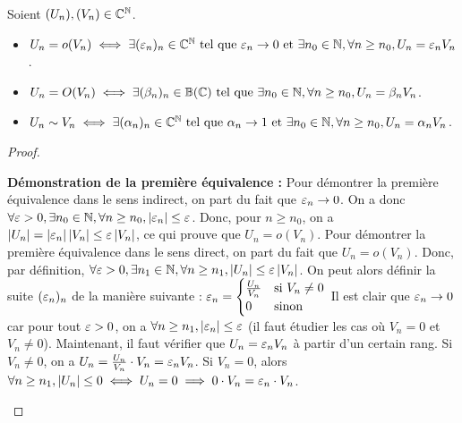 \documentclass[12pt, a4paper]{report}
\begin{document}
\begin{property}
    Soient $(U_n),(V_n)\in\mathbb{C}^{\mathbb{N}}$.
    \begin{itemize}
        \item $U_n = o(V_n) \iff \exists (\varepsilon_n)_n \in \mathbb{C}^{\mathbb{N}} \text{ tel que } \varepsilon_n \to 0 \text{ et } \exists n_0 \in \mathbb{N}, \forall n \ge n_0, U_n = \varepsilon_n V_n$.
        \item $U_n = O(V_n) \iff \exists (\beta_n)_n \in \mathbb{B}(\mathbb{C}) \text{ tel que } \exists n_0 \in \mathbb{N}, \forall n \ge n_0, U_n = \beta_n V_n$.
        \item $U_n \sim V_n \iff \exists (\alpha_n)_n \in \mathbb{C}^{\mathbb{N}} \text{ tel que } \alpha_n \to 1 \text{ et } \exists n_0 \in \mathbb{N}, \forall n \ge n_0, U_n = \alpha_n V_n$.
    \end{itemize}
\end{property}

\begin{proof}
    \begin{outline}
        \1 \textbf{Démonstration de la première équivalence :}
        \2 Pour démontrer la première équivalence dans le sens indirect, on part du fait que $\varepsilon_n \to 0$. On a donc $\forall \varepsilon > 0, \exists n_0 \in \mathbb{N}, \forall n \ge n_0, \left|\varepsilon_n\right| \le \varepsilon$. Donc, pour $n \ge n_0$, on a $\left|U_n\right| = \left|\varepsilon_n\right|\left|V_n\right| \le \varepsilon \left|V_n\right|$, ce qui prouve que $U_n = o(V_n)$.
        \2 Pour démontrer la première équivalence dans le sens direct, on part du fait que $U_n = o(V_n)$. Donc, par définition, $\forall \varepsilon > 0, \exists n_1 \in \mathbb{N}, \forall n \ge n_1, \left|U_n\right| \le \varepsilon \left|V_n\right|$. On peut alors définir la suite $(\varepsilon_n)_n$ de la manière suivante :
        \3 $\varepsilon_n = \begin{cases}
            \frac{U_n}{V_n} & \text{si } V_n \ne 0\\
            0 & \text{sinon}
        \end{cases}$
        \3 Il est clair que $\varepsilon_n \to 0$ car pour tout $\varepsilon > 0$, on a $\forall n \ge n_1, \left|\varepsilon_n\right| \le \varepsilon$ (il faut étudier les cas où $V_n = 0$ et $V_n\ne0$).
        \2 Maintenant, il faut vérifier que $U_n = \varepsilon_n V_n$ à partir d'un certain rang.
        \2 Si $V_n \ne 0$, on a $U_n = \frac{U_n}{V_n} \cdot V_n = \varepsilon_n V_n$.
        \2 Si $V_n = 0$, alors $\forall n \ge n_1, \left|U_n\right| \le 0 \iff U_n= 0\implies 0 \cdot V_n = \varepsilon_n \cdot V_n$.
    \end{outline}
\end{proof}
\end{document}

